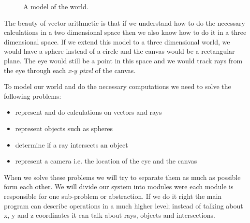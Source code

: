 \documentclass[a4paper,11pt]{article}
\begin{document}
\begin{figure}[h!]
\centering  
{}
\label{fig:world}
\caption{A model of the world.}
\end{figure}

The beauty of vector arithmetic is that if we understand how to do the
necessary calculations in a two dimensional space then we also know
how to do it in a three dimensional space. If we extend this model to
a three dimensional world, we would have a sphere instead of a circle
and the canvas would be a rectangular plane. The eye would still be a
point in this space and we would track rays from the eye through each
{\em x-y pixel} of the canvas.

To model our world and do the necessary computations we need to solve
the following problems:

\begin{itemize}
 \item represent and do calculations on vectors and rays
 \item represent objects such as spheres
 \item determine if a ray intersects an object
 \item represent a camera i.e. the location of the eye and the canvas
\end{itemize}

When we solve these problems we will try to separate them as much as
possible form each other. We will divide our system into modules were
each module is responsible for one sub-problem or abstraction. If we do
it right the main program can describe operations in a much higher
level; instead of talking about x, y and z coordinates it can talk
about rays, objects and intersections.
\end{document}
